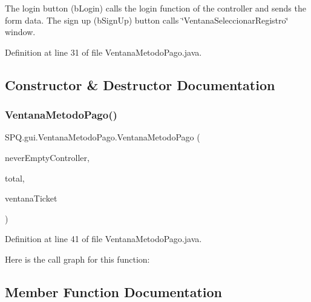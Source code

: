 The login button (b\+Login) calls the login function of the controller and sends the form data. The sign up (b\+Sign\+Up) button calls \char`\"{}\+Ventana\+Seleccionar\+Registro\char`\"{} window. 

Definition at line 31 of file Ventana\+Metodo\+Pago.\+java.



\subsection{Constructor \& Destructor Documentation}
\mbox{\label{class_s_p_q_1_1gui_1_1_ventana_metodo_pago_a26f9c85826129e253d02d7faa3b6f329}} 
\subsubsection{\texorpdfstring{Ventana\+Metodo\+Pago()}{VentanaMetodoPago()}}
{\footnotesize\ttfamily S\+P\+Q.\+gui.\+Ventana\+Metodo\+Pago.\+Ventana\+Metodo\+Pago (\begin{DoxyParamCaption}\item[{\mbox{\hyperlink{class_s_p_q_1_1controller_1_1_never_empty_controller}{Never\+Empty\+Controller}}}]{never\+Empty\+Controller,  }\item[{double}]{total,  }\item[{\mbox{\hyperlink{class_s_p_q_1_1gui_1_1_ventana_ticket}{Ventana\+Ticket}}}]{ventana\+Ticket }\end{DoxyParamCaption})}



Definition at line 41 of file Ventana\+Metodo\+Pago.\+java.

Here is the call graph for this function\+:


\subsection{Member Function Documentation}
\mbox{\label{class_s_p_q_1_1gui_1_1_ventana_metodo_pago_a4cd83e327c681f60072c75b63bfb937d}} 

